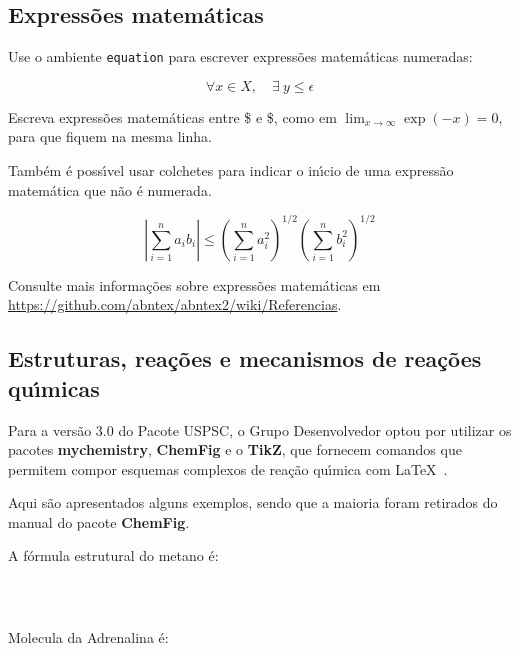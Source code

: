 \subsection{Express\~oes matem\'aticas}

Use o ambiente \texttt{equation} para escrever
express\~oes matem\'aticas numeradas:

\begin{equation}
\forall x \in X, \quad \exists \: y \leq \epsilon
\end{equation}

Escreva express\~oes matem\'aticas entre \$ e \$, como em $ \lim_{x \to \infty}
\exp(-x) = 0 $, para que fiquem na mesma linha.

Tamb\'em \'e poss\'{\i}vel usar colchetes para indicar o in\'{\i}cio de uma express\~ao
matem\'atica que n\~ao \'e numerada.

\[
\left|\sum_{i=1}^n a_ib_i\right|
\le
\left(\sum_{i=1}^n a_i^2\right)^{1/2}
\left(\sum_{i=1}^n b_i^2\right)^{1/2}
\]

Consulte mais informa\c{c}\~oes sobre express\~oes matem\'aticas em
\url{https://github.com/abntex/abntex2/wiki/Referencias}.

\subsection{Estruturas, rea\c{c}\~oes e mecanismos de rea\c{c}\~oes qu\'{\i}micas}\label{Reaquimica}
Para a vers\~ao 3.0 do Pacote USPSC, o Grupo Desenvolvedor optou por utilizar os pacotes \textbf{mychemistry},  \textbf{ChemFig} e o \textbf{TikZ}, que fornecem comandos que permitem compor esquemas complexos de rea\c{c}\~ao qu\'{\i}mica com \LaTeX\ . 

Aqui s\~ao apresentados alguns exemplos, sendo que a maioria foram retirados do manual do pacote \textbf{ChemFig}\cite{ChemFigPac}. 


A f\'ormula estrutural do metano \'e:


 \\

\begin{verbatim}
\end{verbatim} 

Molecula da Adrenalina \'e:

 \\

